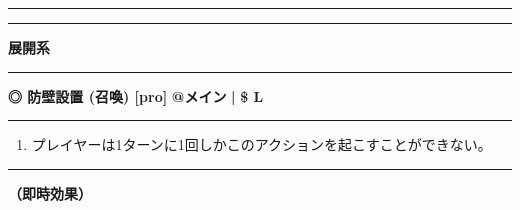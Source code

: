 \documentclass[twocolumn,a5paper,papersize,10pt]{jarticle}
\begin{document}
\begin{center}
\begin{center}
\hrule height 1mm depth 0mm width 66.5mm %
\vspace{1mm}%
{\Large\bf {}}
\vspace{1mm}%
\hrule height 0.5mm depth 0mm width 66.5mm %
\end{center}
\end{center}
\vspace{-1zh}%


\begin{tcolorbox}
{\scriptsize\bf 展開系}
\end{tcolorbox}
\vspace{-1zh}%
\vspace{2mm} %
\hrule height 0.5mm depth 0mm width 66.5mm %
\vspace{1mm} %
{\small\bf ◎ 防壁設置 {\scriptsize (召喚) [pro]}} %
\hfill 
{\footnotesize\bf @メイン }
  {\footnotesize\bf | } {\footnotesize\bf \$ L}


\vspace{1mm}%
\hrule height 0.1mm depth 0mm width 66.5mm %
\vspace{1mm}%


\vspace{-1zh}%
\begin{enumerate}
\renewcommand{\labelenumi}{※}
\setlength{\leftskip}{-0.3cm}
\setlength{\itemsep}{0pt} %
\setlength{\parskip}{0pt} %

\item プレイヤーは1ターンに1回しかこのアクションを起こすことができない。

\vspace{-3mm}%
\end{enumerate}
\vspace{1mm}%
\hrule height 0.1mm depth 0mm width 66.5mm %
\vspace{1mm}%

{\bf（即時効果）}
\end{document}
